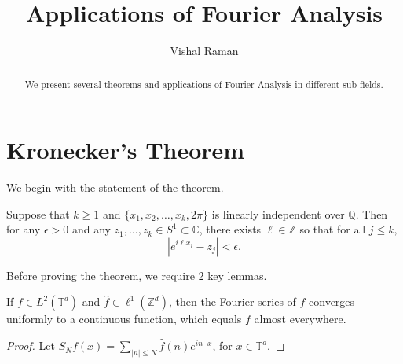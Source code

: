 \documentclass[11pt]{scrartcl}
\newcommand{\Z}{\mathbb{Z}}
\newcommand{\Q}{\mathbb{Q}}
\newcommand{\C}{\mathbb C}
\newcommand{\T}{\mathbb T}
\let \hat \widehat
\newcommand{\<}{\langle}
\renewcommand{\>}{\rangle}
\begin{document}
\title{Applications of Fourier Analysis}
\author{Vishal Raman}
\maketitle
\begin{abstract}
   We present several theorems and applications of Fourier Analysis in different sub-fields.  
\end{abstract}
\section{Kronecker's Theorem}
We begin with the statement of the theorem.
\begin{theorem}[Kronecker] Suppose that $k \ge 1$ and $\{x_1, x_2, \dots, x_k, 2\pi\}$ is linearly independent over $\Q$.  Then for any $\epsilon > 0$ and any $z_1, \dots, z_k \in S^1 \subset \C$, there exists $\ell \in \Z$ so that for all $j \le k,$
$$|e^{i\ell x_j} - z_j| < \epsilon.$$
\end{theorem}
Before proving the theorem, we require 2 key lemmas.  
\begin{lemma} If $f \in L^2(\T^d)$ and $\hat{f} \in \ell^1(\Z^d)$, then the Fourier series of $f$ converges uniformly to a continuous function, which equals $f$ almost everywhere.
\end{lemma}
\begin{proof}
Let $S_Nf(x) = \sum_{|n| \le N} \hat{f}(n)e^{in\cdot x}$, for $x \in \T^d$.  
\end{proof}
\end{document}
